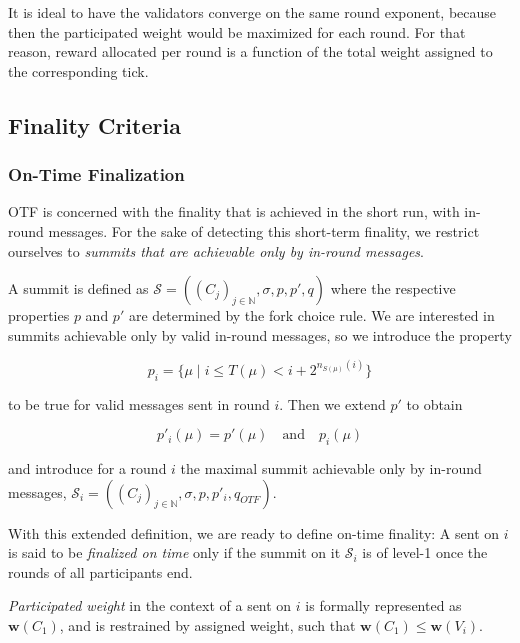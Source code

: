 It is ideal to have the validators converge on the same round exponent, because then the participated weight would be maximized for each round. For that reason, reward allocated per round is a function of the total weight assigned to the corresponding tick.

\subsection{Finality Criteria}
\label{sec:finality-criteria}

\subsubsection*{On-Time Finalization}
\label{sec:on-time-finalization}

OTF is concerned with the finality that is achieved in the short run, with in-round messages. For the sake of detecting this short-term finality, we restrict ourselves to \emph{summits that are achievable only by in-round messages}.

A summit is defined as $\mathcal{S}=((C_j)_{j\in\mathbb{N}}, \sigma,p,p',q)$ where the respective properties $p$ and $p'$ are determined by the fork choice rule. We are interested in summits achievable only by valid in-round messages, so we introduce the property

\begin{equation}
  p_i = \{\mu \mid i \leq T(\mu)< i+2^{n_{S(\mu) }(i)}\}
\end{equation}

to be true for valid messages sent in round $i$. Then we extend $p'$ to obtain

\begin{equation}
  p'_{i}(\mu) = p'(\mu)\quad\text{and}\quad p_{i}(\mu)
\end{equation}

and introduce for a round $i$ the maximal summit achievable only by in-round messages, $\mathcal{S}_i=((C_j)_{j\in\mathbb{N}}, \sigma,p,p'_{i},q_{OTF})$.

With this extended definition, we are ready to define on-time finality: A \PROP sent on $i$ is said to be \emph{finalized on time} only if the summit on it $\mathcal{S}_i$ is of level-1 once the rounds of all participants end.

\emph{Participated weight} in the context of a \PROP sent on $i$ is formally represented as $\boldsymbol{w}(C_1)$, and is restrained by assigned weight, such that $\boldsymbol{w}(C_1) \leq \boldsymbol{w}(V_i)$.

